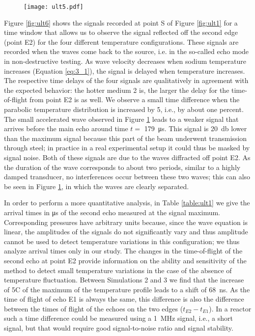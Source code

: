             \begin{figure}[htbp]
                    \centerline{\texttt{[image: ult5.pdf]}}
                \label{fig:ult5}
            \end{figure}
%
            Figure \ref{fig:ult6} shows the signals recorded at point S of Figure \ref{fig:ult1} for a time window that allows us to observe the signal
reflected off the second edge (point E2) for the four different temperature configurations. These signals are recorded when the waves come back to the source,
i.e. in the so-called echo mode in non-destructive testing. As wave velocity decreases when sodium temperature increases (Equation \ref{eq:3_1}), the signal is
delayed when temperature increases. The respective time delays of the four signals are qualitatively in agreement with the expected behavior: the hotter medium
2 is, the larger the delay for the time-of-flight from point E2 is as well. We observe a small time difference when the parabolic temperature distribution is
increased by 5\textdegree{}, i.e., by about one percent. The small accelerated wave observed in Figure \ref{fig:ult5} leads to a weaker signal that arrives
before the main echo around time $t =$ \SI{179}{\micro\second}. This signal is \SI{20}{\decibel} lower than the maximum signal because this part of the beam
underwent transmission through steel; in practice in a real experimental setup it could thus be masked by signal noise. Both of these signals are due to the
waves diffracted off point E2. As the duration of the wave corresponds to about two periods, similar to a highly damped transducer, no interferences occur
between these two waves; this can also be seen in Figure \ref{fig:ult5}, in which the waves are clearly separated.

            In order to perform a more quantitative analysis, in Table \ref{table:ult1} we give the arrival times in \si{\micro\second} of the second echo
measured at the signal maximum. Corresponding pressures have arbitrary units because, since the wave equation is linear, the amplitudes of the signals do not
significantly vary and thus amplitude cannot be used to detect temperature variations in this configuration; we thus analyze arrival times only in our study.
            The changes in the time-of-flight of the second echo at point E2 provide information on the ability and sensitivity of the method to detect small
temperature variations in the case of the absence of temperature fluctuation. Between Simulations 2 and 3 we find that the increase of 5\textdegree{}C of the
maximum of the temperature profile leads to a shift of \SI{68}{\nano\second}. As the time of flight of echo E1 is always the same, this difference is also the
difference between the times of flight of the echoes on the two edges ($t_{E2} - t_{E1}$). In a reactor such a time difference could be measured using a
\SI{1}{\mega\hertz} signal, i.e., a short signal, but that would require good signal-to-noise ratio and signal stability.

